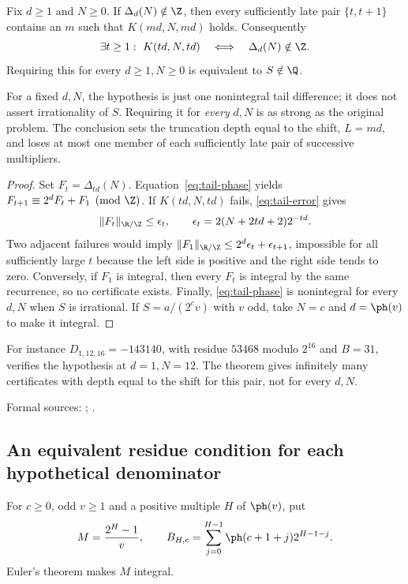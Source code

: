 \documentclass[11pt]{article}
\begin{document}
\begin{theorem}\label{res:fulldepth}
Fix $d\ge1$ and $N\ge0$. If $\Delta_d(N)\notin\Z$, then every sufficiently
late pair $\{t,t+1\}$ contains an $m$ such that $K(md,N,md)$ holds.
Consequently
\[
 \exists t\ge1:\ K(td,N,td)
 \quad\Longleftrightarrow\quad\Delta_d(N)\notin\Z.
\]
Requiring this for every $d\ge1,N\ge0$ is equivalent to $S\notin\Q$.
\end{theorem}
For a fixed $d,N$, the hypothesis is just one nonintegral tail difference;
it does not assert irrationality of $S$. Requiring it for \emph{every}
$d,N$ is as strong as the original problem. The conclusion sets the
truncation depth equal to the shift, $L=md$, and loses at most one member
of each sufficiently late pair of successive multipliers.

\begin{proof}
Set $F_t=\Delta_{td}(N)$. Equation~\eqref{eq:tail-phase} yields
$F_{t+1}\equiv2^dF_t+F_1\pmod\Z$. If $K(td,N,td)$ fails,
\eqref{eq:tail-error} gives
\[
 \|F_t\|_{\R/\Z}\le\epsilon_t,
 \qquad \epsilon_t=2(N+2td+2)2^{-td}.
\]
Two adjacent failures would imply
$\|F_1\|_{\R/\Z}\le2^d\epsilon_t+\epsilon_{t+1}$, impossible for all sufficiently
large $t$ because the left side is positive and the right side tends to zero.
Conversely, if $F_1$ is integral, then every $F_t$ is integral by the same
recurrence, so no certificate exists. Finally, \eqref{eq:tail-phase} is
nonintegral for every $d,N$ when $S$ is irrational. If
$S=a/(2^cv)$ with $v$ odd, take $N=c$ and $d=\ph(v)$ to make it integral.
\end{proof}
For instance $D_{1,12,16}=-143140$, with residue $53468$ modulo $2^{16}$
and $B=31$, verifies the hypothesis at $d=1,N=12$. The theorem gives
infinitely many certificates with depth equal to the shift for this pair,
not for every $d,N$.

\noindent Formal sources: ;
.

\subsection{An equivalent residue condition for each hypothetical denominator}\label{sec:frontier}
For $c\ge0$, odd $v\ge1$ and a positive multiple $H$ of $\ph(v)$, put
\[
 M=\frac{2^H-1}{v},\qquad
 B_{H,c}=\sum_{j=0}^{H-1}\ph(c+1+j)2^{H-1-j}.
\]
Euler's theorem makes $M$ integral.
\end{document}
